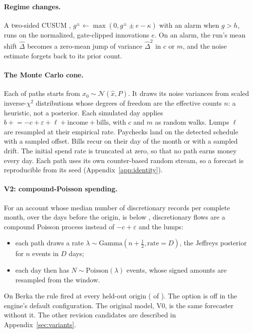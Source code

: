 \paragraph{Regime changes.} A two-sided CUSUM \citep{page1954},
$g^\pm \leftarrow \max(0, g^\pm \pm e - \kappa)$ with an alarm when
$g > h$, runs on the normalized, gate-clipped innovations $e$. On an alarm,
the run's mean shift $\hat\Delta$ becomes a zero-mean jump of variance
$\hat\Delta^2$ in $c$ or $m$, and the noise estimate forgets back to its
prior count.

\paragraph{The Monte Carlo cone.} Each of  paths starts from
$x_0 \sim \mathcal N(\hat x, P)$. It draws its noise variances from scaled
inverse-$\chi^2$ distributions whose degrees of freedom are the effective
counts $n$: a heuristic, not a posterior. Each simulated day applies
$b \mathrel{+}= -c + \varepsilon + \ell + \text{income} + \text{bills}$,
with $c$ and $m$ as random walks. Lumps $\ell$ are resampled at their
empirical rate. Paychecks land on the detected schedule with a sampled
offset. Bills recur on their day of the month or with a sampled drift. The
initial spend rate is truncated at zero, so that no path earns money every
day. Each path uses its own counter-based random stream, so a forecast is
reproducible from its seed (Appendix~\ref{app:identity}).

\paragraph{V2: compound-Poisson spending.} For an account whose median
number of discretionary records per complete month, over the
 days before the origin, is below ,
discretionary flows are a compound Poisson process instead of
$-c + \varepsilon$ and the lumps:
\begin{itemize}
\item each path draws a rate
  $\lambda \sim \mathrm{Gamma}(n + \tfrac12, \text{rate} = D)$, the Jeffreys
  posterior for $n$ events in $D$ days;
\item each day then has $N \sim \mathrm{Poisson}(\lambda)$ events, whose
  signed amounts are resampled from the window.
\end{itemize}
On Berka the rule fired at every held-out origin
( of ). The option is
off in the engine's default configuration. The original model, V0, is the
same forecaster without it. The other revision candidates are described in
Appendix~\ref{sec:variants}.
